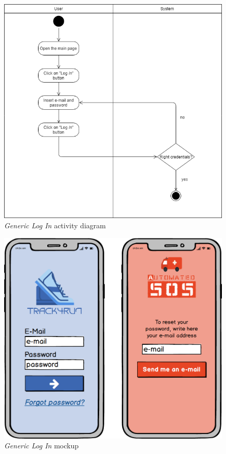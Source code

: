 \begin{figure}
\begin{center}
  \includegraphics[width=\textwidth]{img/activity/IndividualLogin.png}
  \hspace{0.05\linewidth}
  \centering
  \caption{\textit{Generic Log In} activity diagram}
  \label{img:genericIndividualLoginActivityDiagram}
\end{center}
\end{figure}

\begin{figure}
\begin{center}
  \includegraphics[width=\textwidth]{img/mockup/Generic_Login.png}
  \hspace{0.05\linewidth}
  \centering
  \caption{\textit{Generic Log In} mockup}
  \label{img:genericLogInMockup}
\end{center}
\end{figure}

